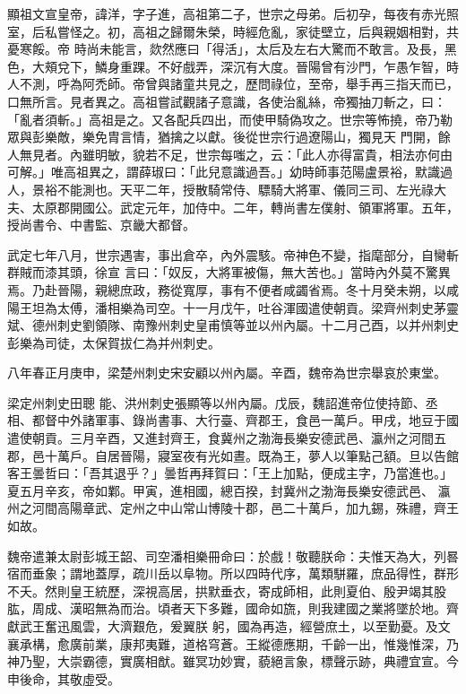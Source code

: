 
\begin{pinyinscope}

 顯祖文宣皇帝，諱洋，字子進，高祖第二子，世宗之母弟。后初孕，每夜有赤光照室，后私嘗怪之。初，高祖之歸爾朱榮，時經危亂，家徒壁立，后與親姻相對，共憂寒餒。帝
 時尚未能言，欻然應曰「得活」，太后及左右大驚而不敢言。及長，黑色，大頰兌下，鱗身重踝。不好戲弄，深沉有大度。晉陽曾有沙門，乍愚乍智，時人不測，呼為阿禿師。帝曾與諸童共見之，歷問祿位，至帝，舉手再三指天而已，口無所言。見者異之。高祖嘗試觀諸子意識，各使治亂絲，帝獨抽刀斬之，曰：「亂者須斬。」高祖是之。又各配兵四出，而使甲騎偽攻之。世宗等怖撓，帝乃勒眾與彭樂敵，樂免胄言情，猶擒之以獻。後從世宗行過遼陽山，獨見天
 門開，餘人無見者。內雖明敏，貌若不足，世宗每嗤之，云：「此人亦得富貴，相法亦何由可解。」唯高祖異之，謂薛琡曰：「此兒意識過吾。」幼時師事范陽盧景裕，默識過人，景裕不能測也。天平二年，授散騎常侍、驃騎大將軍、儀同三司、左光祿大夫、太原郡開國公。武定元年，加侍中。二年，轉尚書左僕射、領軍將軍。五年，授尚書令、中書監、京畿大都督。



 武定七年八月，世宗遇害，事出倉卒，內外震駭。帝神色不變，指麾部分，自臠斬群賊而漆其頭，徐宣
 言曰：「奴反，大將軍被傷，無大苦也。」當時內外莫不驚異焉。乃赴晉陽，親總庶政，務從寬厚，事有不便者咸蠲省焉。冬十月癸未朔，以咸陽王坦為太傅，潘相樂為司空。十一月戊午，吐谷渾國遣使朝貢。梁齊州刺史茅靈斌、德州刺史劉領隊、南豫州刺史皇甫慎等並以州內屬。十二月己酉，以并州刺史彭樂為司徒，太保賀拔仁為并州刺史。



 八年春正月庚申，梁楚州刺史宋安顧以州內屬。辛酉，魏帝為世宗舉哀於東堂。



 梁定州刺史田聰
 能、洪州刺史張顯等以州內屬。戊辰，魏詔進帝位使持節、丞相、都督中外諸軍事、錄尚書事、大行臺、齊郡王，食邑一萬戶。甲戌，地豆于國遣使朝貢。三月辛酉，又進封齊王，食冀州之渤海長樂安德武邑、瀛州之河間五郡，邑十萬戶。自居晉陽，寢室夜有光如晝。既為王，夢人以筆點己額。旦以告館客王曇哲曰：「吾其退乎？」曇哲再拜賀曰：「王上加點，便成主字，乃當進也。」夏五月辛亥，帝如鄴。甲寅，進相國，總百揆，封冀州之渤海長樂安德武邑、
 瀛州之河間高陽章武、定州之中山常山博陵十郡，邑二十萬戶，加九錫，殊禮，齊王如故。



 魏帝遣兼太尉彭城王韶、司空潘相樂冊命曰：於戲！敬聽朕命：夫惟天為大，列晷宿而垂象；謂地蓋厚，疏川岳以阜物。所以四時代序，萬類駢羅，庶品得性，群形不夭。然則皇王統歷，深視高居，拱默垂衣，寄成師相，此則夏伯、殷尹竭其股肱，周成、漢昭無為而治。頃者天下多難，國命如旒，則我建國之業將墜於地。齊獻武王奮迅風雲，大濟艱危，爰翼朕
 躬，國為再造，經營庶土，以至勤憂。及文襄承構，愈廣前業，康邦夷難，道格穹蒼。王縱德應期，千齡一出，惟幾惟深，乃神乃聖，大崇霸德，實廣相猷。雖冥功妙實，藐絕言象，標聲示跡，典禮宜宣。今申後命，其敬虛受。




\end{pinyinscope}
